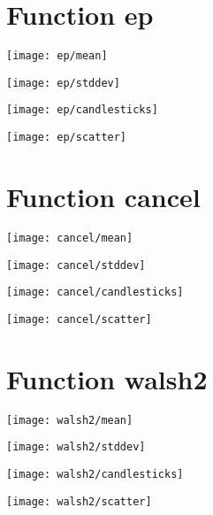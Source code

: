 \section{Function ep}
\begin{center}

\end{center}
\begin{center}
\texttt{[image: ep/mean]}
\end{center}
\begin{center}
\texttt{[image: ep/stddev]}
\end{center}
\begin{center}
\texttt{[image: ep/candlesticks]}
\end{center}
\begin{center}
\texttt{[image: ep/scatter]}
\end{center}
\newpage
\section{Function cancel}
\begin{center}

\end{center}
\begin{center}
\texttt{[image: cancel/mean]}
\end{center}
\begin{center}
\texttt{[image: cancel/stddev]}
\end{center}
\begin{center}
\texttt{[image: cancel/candlesticks]}
\end{center}
\begin{center}
\texttt{[image: cancel/scatter]}
\end{center}
\newpage
\section{Function walsh2}
\begin{center}

\end{center}
\begin{center}
\texttt{[image: walsh2/mean]}
\end{center}
\begin{center}
\texttt{[image: walsh2/stddev]}
\end{center}
\begin{center}
\texttt{[image: walsh2/candlesticks]}
\end{center}
\begin{center}
\texttt{[image: walsh2/scatter]}
\end{center}
